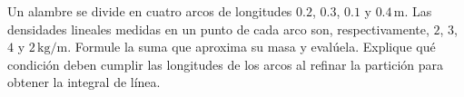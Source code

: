 Un alambre se divide en cuatro arcos de longitudes $0.2$, $0.3$, $0.1$ y $0.4\,\mathrm m$. Las densidades lineales medidas en un punto de cada arco son, respectivamente, $2$, $3$, $4$ y $2\,\mathrm{kg}/\mathrm m$. Formule la suma que aproxima su masa y evalúela. Explique qué condición deben cumplir las longitudes de los arcos al refinar la partición para obtener la integral de línea.
